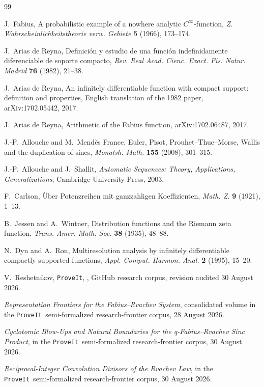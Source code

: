 \documentclass[11pt,oneside]{article}
\numberwithin{equation}{section}
\theoremstyle{definition}
\theoremstyle{remark}
\newcommand{\repo}{\texttt{ProveIt}}
\begin{document}
\begin{thebibliography}{99}

J.~Fabius,
\newblock A probabilistic example of a nowhere analytic $C^\infty$-function,
\newblock \emph{Z. Wahrscheinlichkeitstheorie verw. Gebiete} \textbf{5} (1966), 173--174.

J.~Arias de Reyna,
\newblock Definici\'on y estudio de una funci\'on indefinidamente diferenciable de soporte compacto,
\newblock \emph{Rev. Real Acad. Cienc. Exact. F\'is. Natur. Madrid} \textbf{76} (1982), 21--38.

J.~Arias de Reyna,
\newblock An infinitely differentiable function with compact support: definition and properties,
\newblock English translation of the 1982 paper, arXiv:1702.05442, 2017.

J.~Arias de Reyna,
\newblock Arithmetic of the Fabius function,
\newblock arXiv:1702.06487, 2017.

J.-P.~Allouche and M.~Mend\`es France,
\newblock Euler, Pisot, Prouhet--Thue--Morse, Wallis and the duplication of sines,
\newblock \emph{Monatsh. Math.} \textbf{155} (2008), 301--315.

J.-P.~Allouche and J.~Shallit,
\newblock \emph{Automatic Sequences: Theory, Applications, Generalizations},
\newblock Cambridge University Press, 2003.

F.~Carlson,
\newblock \"Uber Potenzreihen mit ganzzahligen Koeffizienten,
\newblock \emph{Math. Z.} \textbf{9} (1921), 1--13.

B.~Jessen and A.~Wintner,
\newblock Distribution functions and the Riemann zeta function,
\newblock \emph{Trans. Amer. Math. Soc.} \textbf{38} (1935), 48--88.

N.~Dyn and A.~Ron,
\newblock Multiresolution analysis by infinitely differentiable compactly supported functions,
\newblock \emph{Appl. Comput. Harmon. Anal.} \textbf{2} (1995), 15--20.

V.~Reshetnikov,
\newblock \repo, , GitHub research corpus,
\newblock revision audited 30 August 2026.

\newblock \emph{Representation Frontiers for the Fabius--Rvachev System},
\newblock consolidated volume in the \repo\ semi-formalized research-frontier corpus,
28 August 2026.

\newblock \emph{Cyclotomic Blow-Ups and Natural Boundaries for the q-Fabius--Rvachev Sinc Product},
\newblock in the \repo\ semi-formalized research-frontier corpus, 30 August 2026.

\newblock \emph{Reciprocal-Integer Convolution Divisors of the Rvachev Law},
\newblock in the \repo\ semi-formalized research-frontier corpus, 30 August 2026.

\end{thebibliography}
\end{document}

